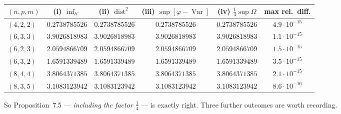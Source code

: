 \documentclass[11pt]{article}
\providecommand{\dist}{\operatorname{dist}}\providecommand{\Var}{\operatorname{Var}}
\begin{document}
\begin{center}\small
\begin{tabular}{lccccc}
\toprule
$(n,p,m)$ & (i) $\inf_{h'}$ & (ii) $\dist^2$ & (iii) $\sup[\varphi-\Var]$ & (iv) $\frac14\sup\Omega$
 & max rel.\ diff.\\
\midrule
$(4,2,2)$ & $0.2738785526$ & $0.2738785526$ & $0.2738785526$ & $0.2738785526$ & $4.9\cdot10^{-15}$\\
$(6,3,3)$ & $3.9026818983$ & $3.9026818983$ & $3.9026818983$ & $3.9026818983$ & $1.1\cdot10^{-15}$\\
$(6,2,3)$ & $2.0594866709$ & $2.0594866709$ & $2.0594866709$ & $2.0594866709$ & $1.5\cdot10^{-15}$\\
$(6,3,2)$ & $1.6591339489$ & $1.6591339489$ & $1.6591339489$ & $1.6591339489$ & $3.5\cdot10^{-15}$\\
$(8,4,4)$ & $3.8064371385$ & $3.8064371385$ & $3.8064371385$ & $3.8064371385$ & $2.1\cdot10^{-15}$\\
$(8,3,5)$ & $3.1083123942$ & $3.1083123942$ & $3.1083123942$ & $3.1083123942$ & $8.6\cdot10^{-16}$\\
\bottomrule
\end{tabular}
\end{center}
So Proposition~7.5 --- \emph{including the factor $\frac14$} --- is exactly right.  Three further
outcomes are worth recording.
\end{document}
